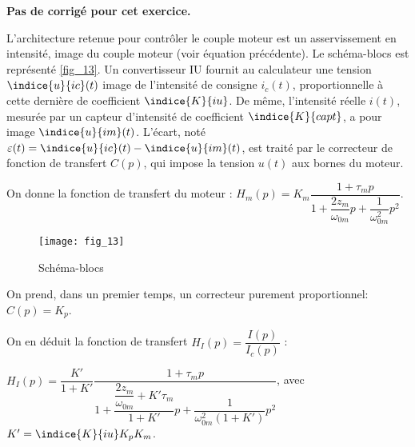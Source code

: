 \normaltrue \difficilefalse \tdifficilefalse
\correctionfalse

\setcounter{question}{0}


\ifcorrection
\else
\textbf{Pas de corrigé pour cet exercice.}
\fi



\ifprof
\else

L’architecture retenue pour contrôler le couple moteur est un asservissement en intensité, image du
couple moteur (voir équation précédente). Le schéma-blocs est représenté \autoref{fig_13}. Un convertisseur IU
fournit au calculateur une tension $\indice{u}{ic}(t)$ image de l’intensité de consigne $i_c(t)$, proportionnelle à cette
dernière de coefficient $\indice{K}{iu}$. De même, l’intensité réelle $i(t)$, mesurée par un capteur d’intensité de
coefficient $\indice{K}{capt}$, a pour image $\indice{u}{im}(t)$. L’écart, noté $\varepsilon(t) = \indice{u}{ic}(t) - \indice{u}{im}(t)$, est traité par le correcteur de fonction de transfert $C(p)$, qui impose la tension $u(t)$ aux bornes du moteur.

On donne la fonction de transfert du moteur : $H_m(p)=K_m\dfrac{1+\tau_m p}{1+\dfrac{2z_m}{\omega_{0m}}p+\dfrac{1}{\omega_{0m}^2}p^2}$.


\begin{figure}[H]
\centering
\texttt{[image: fig\_13]}
\caption{Schéma-blocs \label{fig_13}}
\end{figure}

\fi



\ifprof
\else
On prend, dans un premier temps, un correcteur purement proportionnel: $C(p)=K_p$.

On en déduit la fonction de transfert $H_I(p)=\dfrac{I(p)}{I_c(p)}$ :

$H_I(p)=\dfrac{K'}{1+K'}\dfrac{1+\tau_m p}{1+  
\dfrac{\dfrac{2z_m}{\omega_{0m}}+ K'\tau_m}{1+K'}p 
+ \dfrac{1}{\omega_{0m}^2(1+K')} p^2}$, avec $K'=\indice{K}{iu}K_pK_m$.

